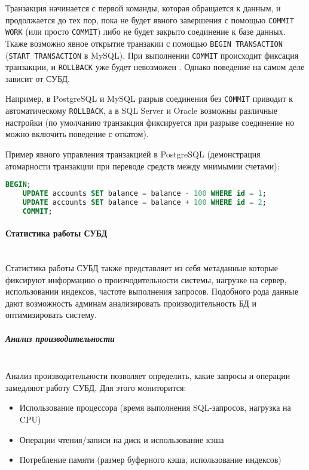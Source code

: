 Транзакция начинается с первой команды, которая обращается к данным, и продолжается до тех пор, пока не будет явного завершения с помощью \texttt{COMMIT WORK} (или просто \texttt{COMMIT}) либо не будет закрыто соединение к базе данных. Ткаже возможно явное открытие транзакии с помощью \texttt{BEGIN TRANSACTION} (\texttt{START TRANSACTION} в MySQL). При выполнении \texttt{COMMIT} происходит фиксация транзакции, и \texttt{ROLLBACK} уже будет невозможен \autocite{Pirogov2009}. Однако поведение на самом деле зависит от СУБД.

Например, в PostgreSQL и MySQL разрыв соединения без \texttt{COMMIT} приводит к автоматическому \texttt{ROLLBACK}, а в SQL Server и Oracle возможны различные настройки (по умолчанию транзакция фиксируется при разрыве соединение но можно включить поведение с откатом).

Пример явного управления транзакцией в PostgreSQL (демонстрация атомарности транзакции при переводе средств между мнимымии счетами):
\begin{lstlisting}[language=SQL]
    BEGIN;
    UPDATE accounts SET balance = balance - 100 WHERE id = 1;
    UPDATE accounts SET balance = balance + 100 WHERE id = 2;
    COMMIT;           
\end{lstlisting}


\paragraph{Статистика работы СУБД} ~\\

Статистика работы СУБД также представляет из себя метаданные которые фиксируют информацию о произчодительности системы, нагрузке на сервер, использовании индексов, частоте выполнения запросов. Подобного рода данные дают возможность админам анализировать производительность БД и оптимизировать систему.

\subparagraph{Анализ производительности} ~\\

Анализ производительности позволяет определить, какие запросы и операции замедляют работу СУБД. Для этого мониторится:
\begin{itemize}
    \item Использование процессора (время выполнения SQL-запросов, нагрузка на CPU)
    \item Операции чтения/записи на диск и использование кэша
    \item Потребление памяти (размер буферного кэша, использование индексов)
\end{itemize}

